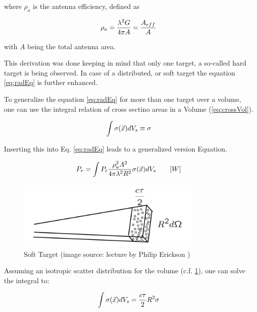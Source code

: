 where $\rho_{a} $ is the antenna efficiency, defined as

\begin{equation}
\label{eq:effi}
	\centering
	\rho_a = \frac{\lambda^2 G }{4 \pi A} = \frac{A_{eff}}{A}
\end{equation}

with $A$ being the total antenna area.

This derivation was done keeping in mind that only one target, a so-called hard target is being observed. In case of a distributed, or soft target the equation \ref{eq:radEq} is further enhanced.

To generalize the equation \ref{eq:radEq} for more than one target over a volume, one can use the integral relation of cross sectino areas in a Volume (\ref{eq:crossVol}).

\begin{equation}
	\label{eq:crossVol}
	\centering
	\int \sigma(\vec{x}) dV_s \equiv \sigma
\end{equation}

Inserting this into Eq. \ref{eq:radEq} leads to a generalized version Equation.

\begin{equation}
\label{eq:radEqGen}
	\centering
	P_{r} = \int P_t \frac{\rho_a^2 A^2 }{4 \pi \lambda^2 R^2} \sigma(\vec{x}) dV_s \qquad [W]
\end{equation}


\begin{figure}
	\centering
	\label{fig:softTarget}
	\includegraphics[width=0.8\textwidth]{images/softTarget}
	\caption{Soft Target (image source: lecture by Philip Erickson \citep{erickson:lecture})}
\end{figure}

Assuming an isotropic scatter distribution for the volume (c.f. \ref{fig:softTarget}), one can solve the integral to:

\begin{equation}
	\label{eq:crossVol}
	\centering
	\int \sigma(\vec{x}) dV_s = \frac{ c \tau}{2} R^2 \sigma
\end{equation}


